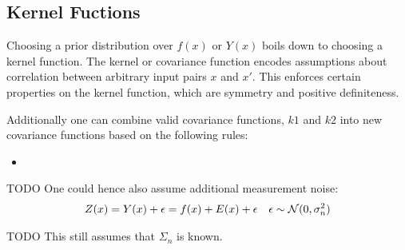 \subsection{Kernel Fuctions}\label{subsec:kernel}

Choosing a prior distribution over $f(x)$ or $Y(x)$ boils down to choosing a kernel function.
The kernel or covariance function encodes assumptions about correlation between arbitrary input pairs $x$ and $x'$.
This enforces certain properties on the kernel function, which are symmetry and positive definiteness.
%
%

Additionally one can combine valid covariance functions, $k1$ and $k2$ into new covariance functions based on the following rules:
\begin{itemize}
    \item
\end{itemize}







TODO
One could hence also assume additional measurement noise:
\begin{align*}
    Z(x) = Y(x) + \epsilon = f(x) + E(x) + \epsilon  && \epsilon \sim \operatorname{\mathcal{N}}(0, \sigma_n^{2})
\end{align*}




TODO
This still  assumes that $\Sigma_n$ is known.



